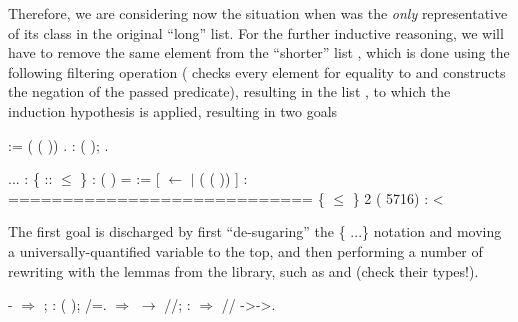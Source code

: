 \coqdocemptyline


Therefore, we are considering now the situation when  was the
\textit{only} representative of its class in the original ``long'' list.  For
the further inductive reasoning, we will have to remove the same
element from the ``shorter'' list , which is done using the
following filtering operation (  checks every element for
equality to  and  constructs the negation of the passed
predicate), resulting in the list , to which the induction
hypothesis is applied, resulting in two goals


\begin{coqdoccode}
\coqdocemptyline
\coqdocnoindent
{}  :=  ( ( )) .\coqdoceol
\coqdocnoindent
{}: ( );  .\coqdoceol
\coqdocemptyline
\end{coqdoccode}
\coqdoceol
\coqdocemptyline
\coqdocindent{1.00em}
...\coqdoceol
\coqdocindent{1.00em}
 : \{  ::  \ensuremath{\le} \}\coqdoceol
\coqdocindent{1.00em}
 : (  ) = \coqdoceol
\coqdocindent{1.00em}
 := [  \ensuremath{\leftarrow}  \ensuremath{|} ( ( )) ] :  \coqdoceol
\coqdocindent{1.00em}
============================\coqdoceol
\coqdocindent{1.50em}
\{  \ensuremath{\le} \}\coqdoceol
\coqdocnoindent
\coqdoceol
\coqdocnoindent
{} 2 ( 5716) :\coqdoceol
\coqdocindent{0.50em}
  <  

\coqdocemptyline


The first goal is discharged by first ``de-sugaring'' the \{ ...\}
notation and moving a universally-quantified variable to the top, and
then performing a number of rewriting with the lemmas from the
 library, such as  and  (check their types!).
\begin{coqdoccode}
\coqdocemptyline
\coqdocnoindent
- \ensuremath{\Rightarrow} ; : ( );      /=.\coqdoceol
\coqdocindent{1.00em}
  \ensuremath{\Rightarrow} \ensuremath{\rightarrow} //; :    \ensuremath{\Rightarrow} // ->->.\coqdoceol
\coqdocemptyline
\end{coqdoccode}


